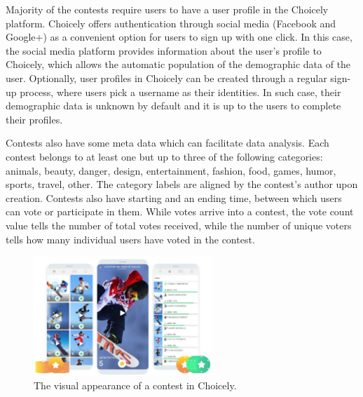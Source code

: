     Majority of the contests require users to have a user profile in the Choicely platform. Choicely offers authentication through social media (Facebook and Google+) as a convenient option for users to sign up with one click. In this case, the social media platform provides information about the user's profile to Choicely, which allows the automatic population of the demographic data of the user. Optionally, user profiles in Choicely can be created through a regular sign-up process, where users pick a username as their identities. In such case, their demographic data is unknown by default and it is up to the users to complete their profiles. 

    Contests also have some meta data which can facilitate data analysis. Each contest belongs to at least one but up to three of the following categories: animals, beauty, danger, design, entertainment, fashion, food, games, humor, sports, travel, other. The category labels are aligned by the contest's author upon creation. Contests also have starting and an ending time, between which users can vote or participate in them. While votes arrive into a contest, the vote count value tells the number of total votes received, while the number of unique voters tells how many individual users have voted in the contest. 

    \begin{figure}[h] 
        \begin{center}
            \includegraphics[width=0.6\textwidth]{images/vote_trick_of_the_day.png}
            \caption{The visual appearance of a contest in Choicely.}
            \label{vote_trick_of_the_day}
        \end{center}
    \end{figure}

